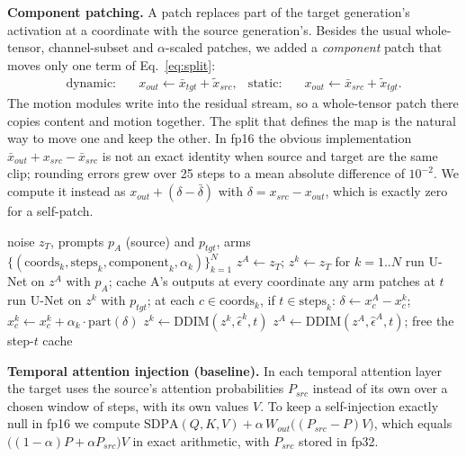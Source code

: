 \documentclass[twoside,english]{article}
\newcommand{\xs}{\bar{x}}         %
\newcommand{\xd}{\tilde{x}}       %
\begin{document}
\textbf{Component patching.} A patch replaces part of the target generation's activation at a
coordinate with the source generation's. Besides the usual whole-tensor, channel-subset and
$\alpha$-scaled patches, we added a \emph{component} patch that moves only one term of
Eq.~\eqref{eq:split}:
\begin{align}
\text{dynamic:}\quad & x_{out} \leftarrow \xs_{tgt} + \xd_{src}, &
\text{static:}\quad & x_{out} \leftarrow \xs_{src} + \xd_{tgt}.
\end{align}
The motion modules write into the residual stream, so a whole-tensor patch there copies content
and motion together. The split that defines the map is the natural way to move one and keep the
other. In fp16 the obvious implementation $\xs_{out} + x_{src} - \xs_{src}$ is not an exact
identity when source and target are the same clip; rounding errors grew over 25 steps to a
mean absolute difference of $10^{-2}$. We compute it instead as $x_{out} + (\delta - \bar\delta)$
with $\delta = x_{src} - x_{out}$, which is exactly zero for a self-patch.

\begin{algorithm}[!h]
\caption{One edit: source A and $N$ target arms denoised in lockstep from one noise tensor}
\label{alg:edit}
\begin{algorithmic}[1]
\Require noise $z_T$, prompts $p_A$ (source) and $p_{tgt}$, arms $\{(\text{coords}_k, \text{steps}_k, \text{component}_k, \alpha_k)\}_{k=1}^N$
\State $z^{A} \gets z_T$; \; $z^{k} \gets z_T$ for $k = 1..N$
  \State run U-Net on $z^{A}$ with $p_A$; cache A's outputs at every coordinate any arm patches at $t$
    \State run U-Net on $z^{k}$ with $p_{tgt}$; at each $c \in \text{coords}_k$, if $t \in \text{steps}_k$:
    \State \hspace{1em} $\delta \gets x^A_c - x^k_c$; \; $x^k_c \gets x^k_c + \alpha_k \cdot \mathrm{part}(\delta)$
    \State $z^{k} \gets \mathrm{DDIM}(z^{k}, \hat\epsilon^{k}, t)$
  \EndFor
  \State $z^{A} \gets \mathrm{DDIM}(z^{A}, \hat\epsilon^{A}, t)$; free the step-$t$ cache
\EndFor
\end{algorithmic}
\end{algorithm}

\textbf{Temporal attention injection (baseline).} In each temporal attention layer the target
uses the source's attention probabilities $P_{src}$ instead of its own over a chosen window of
steps, with its own values $V$. To keep a self-injection exactly null in fp16 we compute
$\mathrm{SDPA}(Q,K,V) + \alpha\, W_{out}\big((P_{src}-P)V\big)$, which equals
$\big((1-\alpha)P + \alpha P_{src}\big)V$ in exact arithmetic, with $P_{src}$ stored in fp32.
\end{document}
